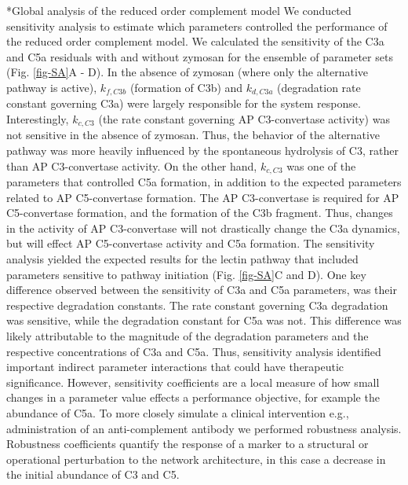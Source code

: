 \documentclass[12pt]{article}
\makeatletter
\renewcommand\subsection{\@startsection
	{subsection}{2}{0mm}
	{-0.05in}
	{-0.5\baselineskip}
	{\normalfont\normalsize\bfseries}}
\makeatother
\begin{document}
%
\subsection*{Global analysis of the reduced order complement model}
We conducted sensitivity analysis to estimate which parameters controlled the performance of the reduced order complement model.
We calculated the sensitivity of the C3a and C5a residuals with and without zymosan for the ensemble of parameter sets (Fig. \ref{fig-SA}A - D).
In the absence of zymosan (where only the alternative pathway is active), $k_{f,C3b}$ (formation of C3b) and $k_{d,C3a}$ (degradation rate constant governing C3a)
were largely responsible for the system response. Interestingly, $k_{c,C3}$ (the rate constant governing AP C3-convertase activity) was not sensitive in the absence of zymosan.
Thus, the behavior of the alternative pathway was more heavily influenced by the spontaneous hydrolysis of C3, rather than AP C3-convertase activity.
On the other hand, $k_{c,C3}$ was one of the parameters that controlled C5a formation, in addition to the expected parameters related to AP C5-convertase formation.
The AP C3-convertase is required for AP C5-convertase formation, and the formation of the C3b fragment.
Thus, changes in the activity of AP C3-convertase will not drastically change the C3a dynamics, but will effect AP C5-convertase activity and C5a formation.
The sensitivity analysis yielded the expected results for the lectin pathway that included parameters sensitive to pathway initiation (Fig. \ref{fig-SA}C and D).
One key difference observed between the sensitivity of C3a and C5a parameters, was their respective degradation constants.
The rate constant governing C3a degradation was sensitive, while the degradation constant for C5a was not.
This difference was likely attributable to the magnitude of the degradation parameters and the respective concentrations of C3a and C5a.
Thus, sensitivity analysis identified important indirect parameter interactions that could have therapeutic significance.
However, sensitivity coefficients are a local measure of how small changes in a parameter value effects a performance objective, for example
the abundance of C5a. To more closely simulate a clinical intervention e.g., administration of an anti-complement antibody we performed
robustness analysis. Robustness coefficients quantify the response of a marker to a structural or operational perturbation to the network architecture,
in this case a decrease in the initial abundance of C3 and C5.
\end{document}
